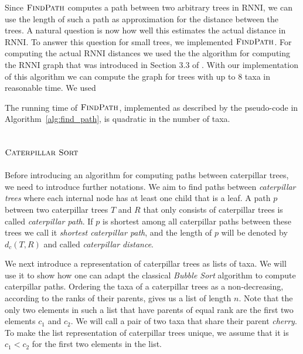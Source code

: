 \documentclass{amsart}
\newcommand{\rnni}{\mathrm{RNNI}}
\newcommand{\csort}{\textsc{Caterpillar Sort}}
\newcommand{\findpath}{\textsc{FindPath}}
\begin{document}
Since $\findpath$ computes a path between two arbitrary trees in $\rnni$, we can use the length of such a path as approximation for the distance between the trees.
A natural question is now how well this estimates the actual distance in $\rnni$.
To answer this question for small trees, we implemented $\findpath$.
For computing the actual $\rnni$ distances we used the the algorithm for computing the $\rnni$ graph that was introduced in Section 3.3 of \autocite{Gavryushkin2018-ol}.
With our implementation of this algorithm
we can compute the graph for trees with up to $8$ taxa in reasonable time. 
We used

The running time of $\findpath$, implemented as described by the pseudo-code in Algorithm~\ref{alg:find_path}, is quadratic in the number of taxa.


\subsection{$\csort$}
\label{section:alg_csort}


Before introducing an algorithm for computing paths between caterpillar trees, we need to introduce further notations.
We aim to find paths between \emph{caterpillar trees} where each internal node has at least one child that is a leaf.
A path $p$ between two caterpillar trees $T$ and $R$ that only consists of caterpillar trees is called \emph{caterpillar path}.
If $p$ is shortest among all caterpillar paths between these trees we call it \emph{shortest caterpillar path}, and the length of $p$ will be denoted by $d_c(T,R)$ and called \emph{caterpillar distance}.

We next introduce a representation of caterpillar trees as lists of taxa.
We will use it to show how one can adapt the classical \emph{Bubble Sort} algorithm \autocite{Knuth1997-pi} to compute caterpillar paths.
Ordering the taxa of a caterpillar trees as a non-decreasing, according to the ranks of their parents, gives us a list of length $n$.
Note that the only two elements in such a list that have parents of equal rank are the first two elements $c_1$ and $c_2$.
We will call a pair of two taxa that share their parent \emph{cherry}.
To make the list representation of caterpillar trees unique, we assume that it is $c_1 < c_2$ for the first two elements in the list.
\end{document}
